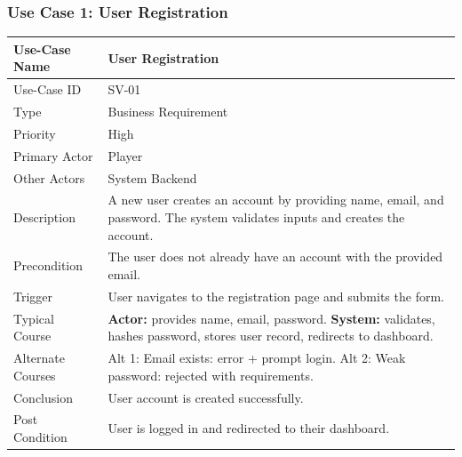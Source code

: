 ﻿\documentclass[11pt,a4paper]{article}
\begin{document}
\subsubsection*{Use Case 1: User Registration}
\begin{longtable}{|L{3.5cm}|L{11cm}|}
\hline
Use-Case Name & User Registration \\ \hline
Use-Case ID & SV-01 \\ \hline
Type & Business Requirement \\ \hline
Priority & High \\ \hline
Primary Actor & Player \\ \hline
Other Actors & System Backend \\ \hline
Description & A new user creates an account by providing name, email, and password. The system validates inputs and creates the account. \\ \hline
Precondition & The user does not already have an account with the provided email. \\ \hline
Trigger & User navigates to the registration page and submits the form. \\ \hline
Typical Course & \textbf{Actor:} provides name, email, password. \textbf{System:} validates, hashes password, stores user record, redirects to dashboard. \\ \hline
Alternate Courses & Alt 1: Email exists: error + prompt login. Alt 2: Weak password: rejected with requirements. \\ \hline
Conclusion & User account is created successfully. \\ \hline
Post Condition & User is logged in and redirected to their dashboard. \\ \hline
\end{longtable}
\end{document}
